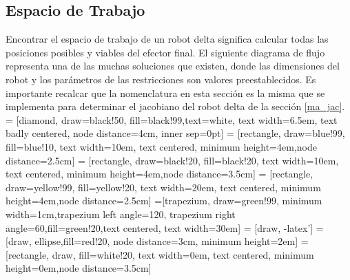         \newpage

        \newpage

        
    \subsection{Espacio de Trabajo}
     Encontrar el espacio de trabajo de un robot delta significa calcular todas las posiciones posibles y viables del efector final. El siguiente diagrama de flujo representa una de las muchas soluciones que existen, donde las dimensiones del robot y los parámetros de las restricciones son valores preestablecidos. Es importante recalcar que la nomenclatura en esta sección es la misma que se implementa para determinar el jacobiano del robot delta de la sección \ref{ma_jac}. 
 = [diamond, draw=black!50, fill=black!99,text=white, 
    text width=6.5em, text badly centered, node distance=4cm, inner sep=0pt]
 = [rectangle, draw=blue!99, fill=blue!10, 
    text width=10em, text centered,   minimum height=4em,node distance=2.5cm]
 = [rectangle, draw=black!20, fill=black!20, 
    text width=10em, text centered,   minimum height=4em,node distance=3.5cm]
 = [rectangle, draw=yellow!99, fill=yellow!20, 
    text width=20em, text centered,   minimum height=4em,node distance=2.5cm]
=[trapezium, draw=green!99, minimum width=1cm,trapezium left angle=120, trapezium right angle=60,fill=green!20,text centered, text width=30em]
 = [draw, -latex']
 = [draw, ellipse,fill=red!20, node distance=3cm, minimum height=2em]
 = [rectangle, draw, fill=white!20, 
    text width=0em, text centered,   minimum height=0em,node distance=3.5cm]
